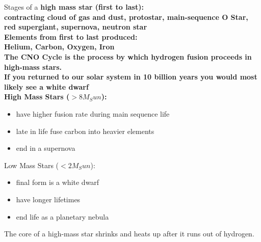 Stages of a \bf{high mass star} (first to last):\\
contracting cloud of gas and dust, protostar, main-sequence O Star, red supergiant, supernova, neutron star\\
Elements from first to last produced: \\
Helium, Carbon, Oxygen, Iron \\
The \bf{CNO Cycle} is the process by which hydrogen fusion proceeds in high-mass stars. \\
If you returned to our solar system in 10 billion years you would most likely see a white dwarf\\
High Mass Stars ($>8M_Sun$):
\begin{itemize}
\item have higher fusion rate during main sequence life
\item late in life fuse carbon into heavier elements
\item end in a supernova
\end{itemize}
Low Mass Stars ($<2M_Sun$):
\begin{itemize}
\item final form is a white dwarf
\item have longer lifetimes
\item end life as a planetary nebula
\end{itemize}
The core of a high-mass star shrinks and heats up after it runs out of hydrogen.\\
